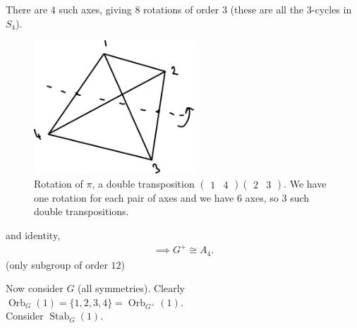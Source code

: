 There are $4$ such axes, giving $8$ rotations of order $3$ (these are all the $3$-cycles in $S_4$).

\begin{figure} 
    \centering 
    \includegraphics[height=5cm]{figures/07-tetrahedron-double-transposition} 
    \caption{Rotation of $\pi$, a double transposition $\begin{pmatrix}1 & 4\end{pmatrix} \begin{pmatrix}2 & 3\end{pmatrix}$. We have one rotation for each pair of axes and we have $6$ axes, so $3$ such double transpositions.}
\end{figure}

and identity, 
\begin{align*}
    \implies G^+ \cong A_4.
\end{align*} (only subgroup of order $12$)

Now consider $G$ (all symmetries).
Clearly $\operatorname{Orb}_G(1) = \{1, 2, 3, 4\} = \operatorname{Orb}_{G^+}(1)$. \\
Consider $\operatorname{Stab}_G(1)$.

